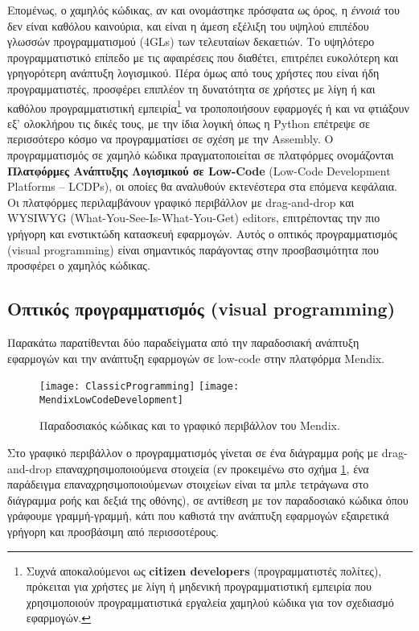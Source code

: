         Επομένως, ο χαμηλός κώδικας, αν και ονομάστηκε πρόσφατα ως όρος, η \textit{έννοιά} του δεν είναι καθόλου καινούρια, και είναι η άμεση εξέλιξη του υψηλού επιπέδου γλωσσών προγραμματισμού (4GLs) των τελευταίων δεκαετιών. Το υψηλότερο προγραμματιστικό επίπεδο με τις αφαιρέσεις που διαθέτει, επιτρέπει ευκολότερη και γρηγορότερη ανάπτυξη λογισμικού. Πέρα όμως από τους χρήστες που είναι ήδη προγραμματιστές, προσφέρει επιπλέον τη δυνατότητα σε χρήστες με λίγη ή και καθόλου προγραμματιστική εμπειρία\footnote{Συχνά αποκαλούμενοι ως \textbf{citizen developers} (προγραμματιστές πολίτες), πρόκειται για χρήστες με λίγη ή μηδενική προγραμματιστική εμπειρία που χρησιμοποιούν προγραμματιστικά εργαλεία χαμηλού κώδικα για τον σχεδιασμό εφαρμογών.} να τροποποιήσουν εφαρμογές ή και να φτιάξουν εξ' ολοκλήρου τις δικές τους, με την ίδια λογική όπως η Python επέτρεψε σε περισσότερο κόσμο να προγραμματίσει σε σχέση με την Assembly. Ο προγραμματισμός σε χαμηλό κώδικα πραγματοποιείται σε πλατφόρμες ονομάζονται \textbf{Πλατφόρμες Ανάπτυξης Λογισμικού σε Low-Code} (Low-Code Development Platforms -- LCDPs), οι οποίες θα αναλυθούν εκτενέστερα στα επόμενα κεφάλαια. Οι πλατφόρμες περιλαμβάνουν γραφικό περιβάλλον με drag-and-drop και WYSIWYG (What-You-See-Is-What-You-Get) editors, επιτρέποντας την πιο γρήγορη και ενστικτώδη κατασκευή εφαρμογών. Αυτός ο οπτικός προγραμματισμός (visual programming) είναι σημαντικός παράγοντας στην προσβασιμότητα που προσφέρει ο χαμηλός κώδικας. \cite{LowCodeMendix} \cite{LowCodeSimon} \cite{LowCodeDemocratization}

            \subsection{Οπτικός προγραμματισμός (visual programming)}
                Παρακάτω παρατίθενται δύο παραδείγματα από την παραδοσιακή ανάπτυξη εφαρμογών και την ανάπτυξη εφαρμογών σε low-code στην πλατφόρμα Mendix.

                \begin{figure}[H] \noindent \centering
                        \texttt{[image: ClassicProgramming]}
                        \texttt{[image: MendixLowCodeDevelopment]}
                        \caption{Παραδοσιακός κώδικας και το γραφικό περιβάλλον του Mendix.}
                        \label{fig:codevsmendix}
                \end{figure}

                Στο γραφικό περιβάλλον ο προγραμματισμός γίνεται σε ένα διάγραμμα ροής με drag-and-drop επαναχρησιμοποιούμενα στοιχεία (εν προκειμένω στο σχήμα \ref{fig:codevsmendix}, ένα παράδειγμα επαναχρησιμοποιούμενων στοιχείων είναι τα μπλε τετράγωνα στο διάγραμμα ροής και δεξιά της οθόνης), σε αντίθεση με τον παραδοσιακό κώδικα όπου γράφουμε γραμμή-γραμμή, κάτι που καθιστά την ανάπτυξη εφαρμογών εξαιρετικά γρήγορη και προσβάσιμη από περισσοτέρους.

